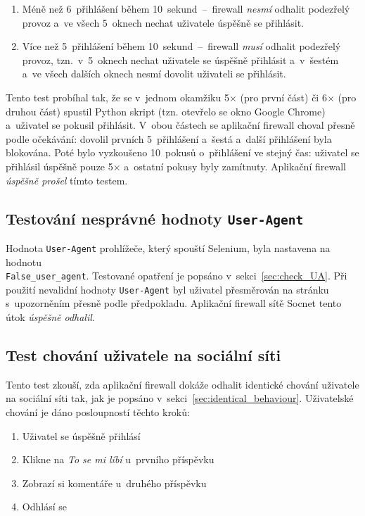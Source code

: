 \begin{enumerate}
  \item Méně než 6~přihlášení během 10~sekund~--~firewall \textit{nesmí} odhalit podezřelý provoz a~ve všech 5~oknech nechat uživatele úspěšně se přihlásit.
  \item Více než 5~přihlášení během 10~sekund~--~firewall \textit{musí} odhalit podezřelý provoz, tzn.~v~5~oknech nechat uživatele se úspěšně přihlásit a~v~šestém a~ve všech dalších oknech nesmí dovolit uživateli se přihlásit.
\end{enumerate}

\noindent
Tento test probíhal tak, že se v~jednom okamžiku 5$\times$ (pro první část) či 6$\times$ (pro druhou část) spustil Python skript (tzn. otevřelo se okno Google Chrome) a~uživatel se pokusil přihlásit. V~obou částech se aplikační firewall choval přesně podle očekávání: dovolil prvních 5~přihlášení a~šestá a~další přihlášení byla blokována. Poté bylo vyzkoušeno 10~pokusů o~přihlášení ve stejný čas: uživatel se přihlásil úspěšně pouze 5$\times$ a~ostatní pokusy byly zamítnuty. Aplikační firewall \textit{úspěšně prošel} tímto testem.

\subsection*{Testování nesprávné hodnoty \texttt{User-Agent}}
Hodnota \texttt{User-Agent} prohlížeče, který spouští Selenium, byla nastavena na hodnotu \\ \texttt{False\_user\_agent}. Testované opatření je popsáno v~sekci~\ref{sec:check_UA}. Při použití nevalidní hodnoty \texttt{User-Agent} byl uživatel přesměrován na stránku s~upozorněním přesně podle předpokladu. Aplikační firewall sítě Socnet tento útok \textit{úspěšně odhalil}.

\subsection*{Test chování uživatele na sociální síti}
Tento test zkouší, zda aplikační firewall dokáže odhalit identické chování uživatele na sociální síti tak, jak je popsáno v~sekci~\ref{sec:identical_behaviour}. Uživatelské chování je dáno posloupností těchto kroků:

\begin{enumerate}
  \item Uživatel se úspěšně přihlásí
  \item Klikne na \textit{To se mi líbí} u~prvního příspěvku
  \item Zobrazí si komentáře u~druhého příspěvku
  \item Odhlásí se
\end{enumerate}

